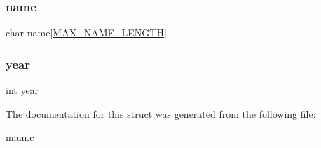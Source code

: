 \hypertarget{structclass_ad50982abf9e9bbbc784f8f17fa25b1b2}{}\label{structclass_ad50982abf9e9bbbc784f8f17fa25b1b2} 
\subsubsection{\texorpdfstring{name}{name}}
{\footnotesize\ttfamily char name\mbox{[}\hyperlink{main_8c_a0c397a708cec89c74029582574516b30}{M\+A\+X\+\_\+\+N\+A\+M\+E\+\_\+\+L\+E\+N\+G\+TH}\mbox{]}}

\hypertarget{structclass_abeac221e38b7b9ce7df8722c842bf671}{}\label{structclass_abeac221e38b7b9ce7df8722c842bf671} 
\subsubsection{\texorpdfstring{year}{year}}
{\footnotesize\ttfamily int year}



The documentation for this struct was generated from the following file\+:\begin{DoxyCompactItemize}
\item 
\hyperlink{main_8c}{main.\+c}\end{DoxyCompactItemize}
